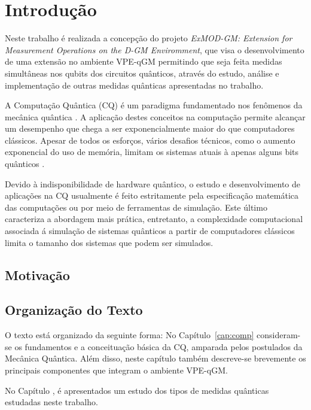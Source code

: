 \documentclass[tcc,capa]{texufpel}
\begin{document}
\tableofcontents

\chapter{Introdução}
Neste trabalho é realizada a concepção do  projeto \emph{ExMOD-GM: Extension for Measurement Operations on the D-GM Enviromment}, que visa o desenvolvimento de uma extensão no ambiente VPE-qGM \cite{maron:2013:ccgrid} permitindo que seja feita medidas simultâneas nos qubits dos circuitos quânticos, através do estudo, análise e implementação de outras medidas quânticas apresentadas no trabalho.

A Computação Quântica (CQ) é um paradigma fundamentado nos fenômenos
da mecânica quântica \cite{chuang00a}. A aplicação destes conceitos na computação permite alcançar um desempenho que  chega a ser exponencialmente maior do que computadores clássicos. Apesar de todos os esforços, vários desafios técnicos, como o aumento exponencial do uso de memória, limitam os sistemas atuais à apenas alguns bits quânticos \cite{steeb2011problems}.

Devido à indisponibilidade de hardware quântico, o estudo e desenvolvimento de aplicações na CQ usualmente é feito estritamente pela especificação matemática das
computações ou por meio de ferramentas de simulação. Este último caracteriza a abordagem mais prática, entretanto, a complexidade computacional associada á simulação de
sistemas quânticos a partir de computadores clássicos limita o tamanho dos sistemas que podem ser simulados.

\section{Motivação}


\section{Organização do Texto}
O texto está organizado da seguinte forma: No Capítulo~\ref{cap:comp} consideram-se os fundamentos e a conceituação básica da CQ, amparada pelos postulados da Mecânica Quântica. Além disso, neste capítulo também descreve-se brevemente os principais componentes que integram o ambiente VPE-qGM.

No Capítulo \label{cap:medidas}, é apresentados um estudo dos tipos de medidas quânticas estudadas neste trabalho.


\begin{quote}

\end{quote}
  
\end{document}
